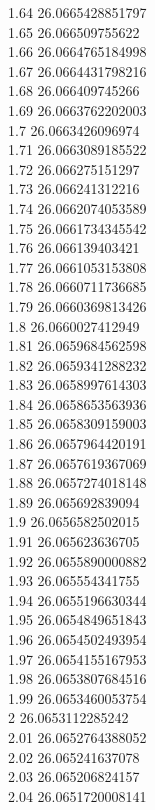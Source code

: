 {1.64	26.0665428851797\\
1.65	26.066509755622\\
1.66	26.0664765184998\\
1.67	26.0664431798216\\
1.68	26.066409745266\\
1.69	26.0663762202003\\
1.7	26.0663426096974\\
1.71	26.0663089185522\\
1.72	26.066275151297\\
1.73	26.066241312216\\
1.74	26.0662074053589\\
1.75	26.0661734345542\\
1.76	26.066139403421\\
1.77	26.0661053153808\\
1.78	26.0660711736685\\
1.79	26.0660369813426\\
1.8	26.0660027412949\\
1.81	26.0659684562598\\
1.82	26.0659341288232\\
1.83	26.0658997614303\\
1.84	26.0658653563936\\
1.85	26.0658309159003\\
1.86	26.0657964420191\\
1.87	26.0657619367069\\
1.88	26.0657274018148\\
1.89	26.065692839094\\
1.9	26.0656582502015\\
1.91	26.065623636705\\
1.92	26.0655890000882\\
1.93	26.065554341755\\
1.94	26.0655196630344\\
1.95	26.0654849651843\\
1.96	26.0654502493954\\
1.97	26.0654155167953\\
1.98	26.0653807684516\\
1.99	26.0653460053754\\
2	26.0653112285242\\
2.01	26.0652764388052\\
2.02	26.065241637078\\
2.03	26.065206824157\\
2.04	26.0651720008141\\
}

